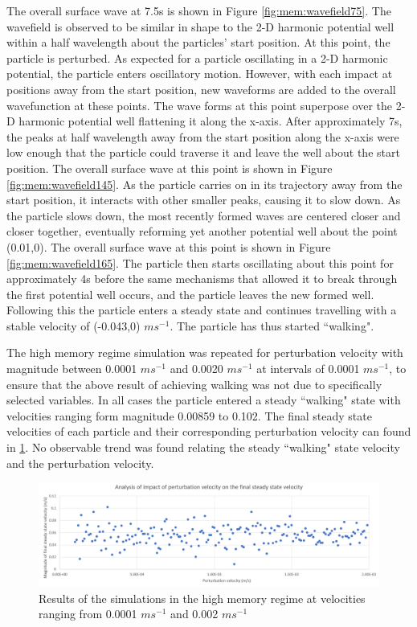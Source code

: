 The overall surface wave at 7.5s is shown in Figure \ref{fig:mem:wavefield75}. The wavefield is observed to be similar in shape to the 2-D harmonic potential well within a half wavelength about the particles' start position. At this point, the particle is perturbed. As expected for a particle oscillating in a 2-D harmonic potential, the particle enters oscillatory motion. However, with each impact at positions away from the start position, new waveforms are added to the overall wavefunction at these points. The wave forms at this point superpose over the 2-D harmonic potential well flattening it along the x-axis. After approximately 7s, the peaks at half wavelength away from the start position along the x-axis were low enough that the particle could traverse it and leave the well about the start position. The overall surface wave at this point is shown in Figure \ref{fig:mem:wavefield145}. As the particle carries on in its trajectory away from the start position, it interacts with other smaller peaks, causing it to slow down. As the particle slows down, the most recently formed waves are centered closer and closer together, eventually reforming yet another potential well about the point (0.01,0). The overall surface wave at this point is shown in Figure \ref{fig:mem:wavefield165}. The particle then starts oscillating about this point for approximately 4s before the same mechanisms that allowed it to break through the first potential well occurs, and the particle leaves the new formed well. Following this the particle enters a steady state and continues travelling with a stable velocity of (-0.043,0) $ms^{-1}$. The particle has thus started ``walking".

The high memory regime simulation was repeated for perturbation velocity with magnitude between 0.0001 $ms^{-1}$ and 0.0020 $ms^{-1}$ at intervals of 0.0001 $ms^{-1}$, to ensure that the above result of achieving walking was not due to specifically selected variables. In all cases the particle entered a steady ``walking" state with velocities ranging form magnitude 0.00859 to 0.102. The final steady state velocities of each particle and their corresponding perturbation velocity can found in \ref{fig:pertVfinal}. No observable trend was found relating the steady ``walking" state velocity and the perturbation velocity.
\begin{figure}
    \centering
    \includegraphics[width=\textwidth]{simulation/figpert.png}
    \caption{Results of the simulations in the high memory regime at velocities ranging from 0.0001 $ms^{-1}$ and 0.002 $ms^{-1}$}
    \label{fig:pertVfinal}
\end{figure}

